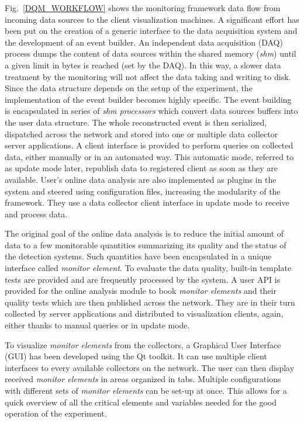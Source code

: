 \documentclass[conference]{IEEEtran}
\begin{document}
Fig.~\ref{DQM_WORKFLOW} shows the monitoring framework data flow from incoming data sources to the client visualization machines. A significant effort has been put on the creation of a generic interface to the data acquisition system and the development of an event builder. An independent data acquisition (DAQ) process dumps the content of data sources within the shared memory (\textit{shm}) until a given limit in bytes is reached (set by the DAQ). In this way, a slower data treatment by the monitoring will not affect the data taking and writing to disk. Since the data structure depends on the setup of the experiment, the implementation of the event builder becomes highly specific. The event building is encapsulated in series of \textit{shm processors} which convert data sources buffers into the user data structure. The whole reconstructed event is then serialized, dispatched across the network and stored into one or multiple data collector server applications.
A client interface is provided to perform queries on collected data, either manually or in an automated way. This automatic mode, referred to as update mode later, republish data to registered client as soon as they are available.
User's online data analysis are also implemented as plugins in the system and steered using configuration files, increasing the modularity of the framework. They use a data collector client interface in update mode to receive and process data.

The original goal of the online data analysis is to reduce the initial amount of data to a few monitorable quantities summarizing its quality and the status of the detection systems. Such quantities have been encapsulated in a unique interface called \textit{monitor element}. To evaluate the data quality, built-in template tests are provided and are frequently processed by the system. A user API is provided for the online analysis module to book \textit{monitor elements} and their quality tests which are then published across the network. They are in their turn collected by server applications and distributed to visualization clients, again, either thanks to manual queries or in update mode.

To visualize \textit{monitor elements} from the collectors, a Graphical User Interface (GUI) has been developed using the Qt\cite{QT} toolkit. It can use multiple client interfaces to every available collectors on the network. The user can then display received \textit{monitor elements} in areas organized in tabs. Multiple configurations with different sets of \textit{monitor elements} can be set-up at once. This allows for a quick overview of all the critical elements and variables needed for the good operation of the experiment.
\end{document}
